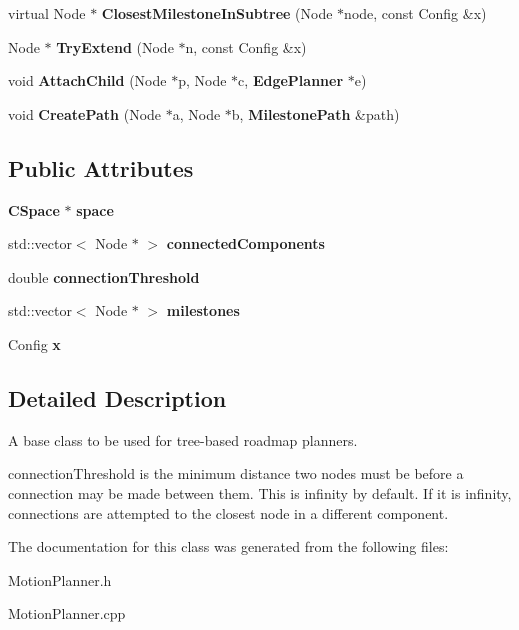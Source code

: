 \begin{DoxyCompactItemize}
\item 
virtual Node $\ast$ {\bfseries Closest\+Milestone\+In\+Subtree} (Node $\ast$node, const Config \&x)\label{classTreeRoadmapPlanner_a0bd96cb7b494dcb7ec59d88d43afcd49}

\item 
Node $\ast$ {\bfseries Try\+Extend} (Node $\ast$n, const Config \&x)\label{classTreeRoadmapPlanner_a1c400fc81cf394c6c4064aae09c64726}

\item 
void {\bfseries Attach\+Child} (Node $\ast$p, Node $\ast$c, {\bf Edge\+Planner} $\ast$e)\label{classTreeRoadmapPlanner_a81b930e7911f3854e86af44614a2cc43}

\item 
void {\bfseries Create\+Path} (Node $\ast$a, Node $\ast$b, {\bf Milestone\+Path} \&path)\label{classTreeRoadmapPlanner_a13204609fccf6991d0185a44a78669fe}

\end{DoxyCompactItemize}
\subsection*{Public Attributes}
\begin{DoxyCompactItemize}
\item 
{\bf C\+Space} $\ast$ {\bfseries space}\label{classTreeRoadmapPlanner_ac52ea753c027983d2240063878087a12}

\item 
std\+::vector$<$ Node $\ast$ $>$ {\bfseries connected\+Components}\label{classTreeRoadmapPlanner_af2e35ac540027c714769f6d43029d3f0}

\item 
double {\bfseries connection\+Threshold}\label{classTreeRoadmapPlanner_affbc62cb9c116b1a8553ae0145a18151}

\item 
std\+::vector$<$ Node $\ast$ $>$ {\bfseries milestones}\label{classTreeRoadmapPlanner_a6422c51272728af9ee68a77378489415}

\item 
Config {\bfseries x}\label{classTreeRoadmapPlanner_a2fe75f4a282c83c50592d5302b7296a8}

\end{DoxyCompactItemize}


\subsection{Detailed Description}
A base class to be used for tree-\/based roadmap planners. 

connection\+Threshold is the minimum distance two nodes must be before a connection may be made between them. This is infinity by default. If it is infinity, connections are attempted to the closest node in a different component. 

The documentation for this class was generated from the following files\+:\begin{DoxyCompactItemize}
\item 
Motion\+Planner.\+h\item 
Motion\+Planner.\+cpp\end{DoxyCompactItemize}

